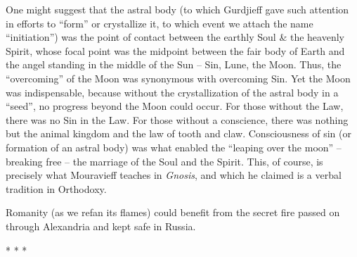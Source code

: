 One might suggest that the astral body (to which Gurdjieff gave such attention in efforts to ``form'' or crystallize it, to which event we attach the name ``initiation'') was the point of contact between the earthly Soul \& the heavenly Spirit, whose focal point was the midpoint between the fair body of Earth and the angel standing in the middle of the Sun -- Sin, Lune, the Moon. Thus, the ``overcoming'' of the Moon was synonymous with overcoming Sin. Yet the Moon was indispensable, because without the crystallization of the astral body in a ``seed'', no progress beyond the Moon could occur. For those without the Law, there was no Sin in the Law. For those without a conscience, there was nothing but the animal kingdom and the law of tooth and claw. Consciousness of sin (or formation of an astral body) was what enabled the ``leaping over the moon'' -- breaking free -- the marriage of the Soul and the Spirit. This, of course, is precisely what Mouravieff teaches in \emph{Gnosis}, and which he claimed is a verbal tradition in Orthodoxy.

Romanity (as we refan its flames) could benefit from the secret fire passed on through Alexandria and kept safe in Russia.



\begin{center}* * *\end{center}

